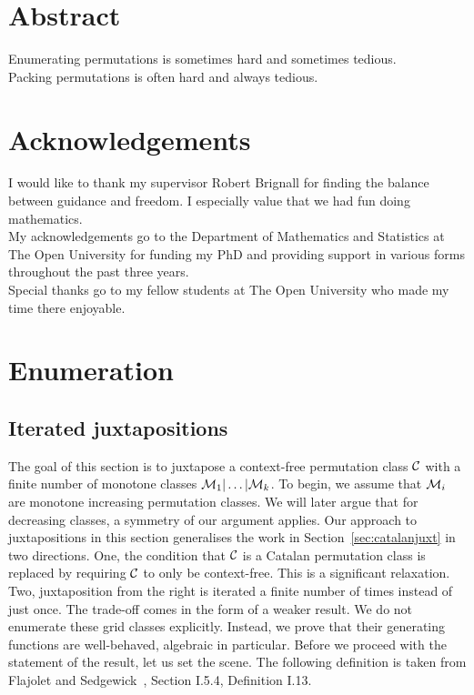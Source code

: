 \message{ !name(thesis.tex)}\documentclass[12pt, a4paper, twoside]{report}
\begin{document}








\setcounter{secnumdepth}{-2}%
\chapter{Abstract}
Enumerating permutations is sometimes hard and sometimes tedious.\\
\noindent Packing permutations is often hard and always tedious.

\chapter{Acknowledgements}
I would like to thank my supervisor Robert Brignall for finding the balance between guidance and freedom. I especially value that we had fun doing mathematics.\\

My acknowledgements go to the Department of Mathematics and Statistics at The Open University for funding my PhD and providing support in various forms throughout the past three years.\\

Special thanks go to my fellow students at The Open University who made my time there enjoyable.
\setcounter{secnumdepth}{2}

\tableofcontents

\chapter{Enumeration}
%

\section{Iterated juxtapositions}
The goal of this section is to juxtapose a context-free permutation class $\mathcal{C}$ with a finite number of monotone classes $\mathcal{M}_1|\ldots|\mathcal{M}_k$. To begin, we assume that $\mathcal{M}_i$ are monotone increasing permutation classes. We will later argue that for decreasing classes, a symmetry of our argument applies. Our approach to juxtapositions in this section generalises the work in Section~\ref{sec:catalanjuxt} in two directions. One, the condition that $\mathcal{C}$ is a Catalan permutation class is replaced by requiring $\mathcal{C}$ to only be context-free. This is a significant relaxation. Two, juxtaposition from the right is iterated a finite number of times instead of just once. The trade-off comes in the form of a weaker result. We do not enumerate these grid classes explicitly. Instead, we prove that their generating functions are well-behaved, algebraic in particular. Before we proceed with the statement of the result, let us set the scene. The following definition is taken from Flajolet and Sedgewick~\cite{analcomb}, Section I.5.4, Definition I.13.
\end{document}

